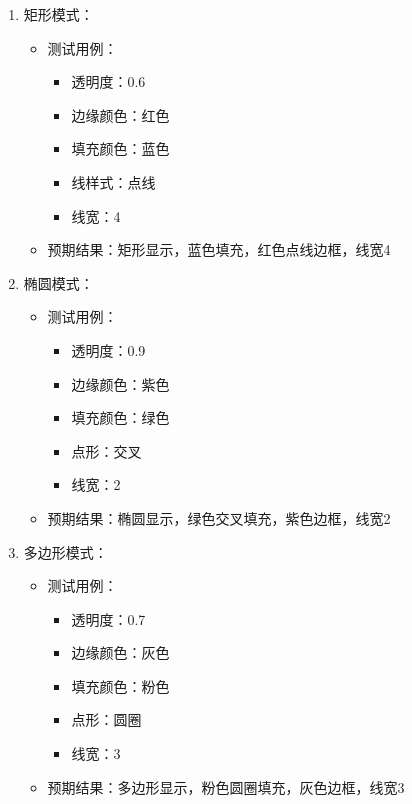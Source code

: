 \documentclass[a4paper,12pt]{report}	%
\begin{document}
\begin{enumerate}
    \item 矩形模式：
    \begin{itemize}
        \item 测试用例：
        \begin{itemize}
            \item 透明度：0.6
            \item 边缘颜色：红色
            \item 填充颜色：蓝色
            \item 线样式：点线
            \item 线宽：4
        \end{itemize}
        \item 预期结果：矩形显示，蓝色填充，红色点线边框，线宽4
    \end{itemize}
    
    \item 椭圆模式：
    \begin{itemize}
        \item 测试用例：
        \begin{itemize}
            \item 透明度：0.9
            \item 边缘颜色：紫色
            \item 填充颜色：绿色
            \item 点形：交叉
            \item 线宽：2
        \end{itemize}
        \item 预期结果：椭圆显示，绿色交叉填充，紫色边框，线宽2
    \end{itemize}
    
    \item 多边形模式：
    \begin{itemize}
        \item 测试用例：
        \begin{itemize}
            \item 透明度：0.7
            \item 边缘颜色：灰色
            \item 填充颜色：粉色
            \item 点形：圆圈
            \item 线宽：3
        \end{itemize}
        \item 预期结果：多边形显示，粉色圆圈填充，灰色边框，线宽3
    \end{itemize}
    

\end{enumerate}
\end{document}
